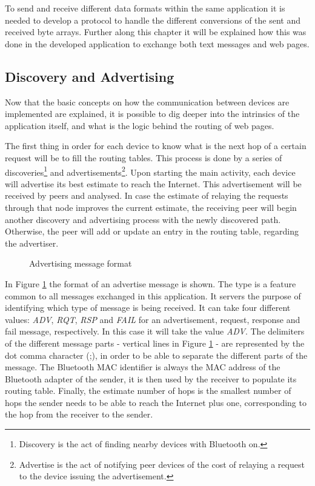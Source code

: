 To send and receive different data formats within the same application it is needed to develop a protocol to handle the different conversions of the sent and received byte arrays. Further along this chapter it will be explained how this was done in the developed application to exchange both text messages and web pages.

\subsection{Discovery and Advertising}
\label{subsec:disandadv}

Now that the basic concepts on how the communication between devices are implemented are explained, it is possible to dig deeper into the intrinsics of the application itself, and what is the logic behind the routing of web pages.

The first thing in order for each device to know what is the next hop of a certain request will be to fill the routing tables. This process is done by a series of discoveries\footnote{Discovery is the act of finding nearby devices with Bluetooth on.} and advertisements\footnote{Advertise is the act of notifying peer devices of the cost of relaying a request to the device issuing the advertisement.}. Upon starting the main activity, each device will advertise its best estimate to reach the Internet. This advertisement will be received by peers and analysed. In case the estimate of relaying the requests through that node improves the current estimate, the receiving peer will begin another discovery and advertising process with the newly discovered path. Otherwise, the peer will add or update an entry in the routing table, regarding the advertiser.

\begin{figure}[ht]
   \noindent{}
	\caption{\label{fig:advmsg} Advertising message format}
\end{figure}

In Figure \ref{fig:advmsg} the format of an advertise message is shown. The type is a feature common to all messages exchanged in this application. It servers the purpose of identifying which type of message is being received. It can take four different values: \textit{ADV}, \textit{RQT}, \textit{RSP} and \textit{FAIL} for an advertisement, request, response and fail message, respectively. In this case it will take the value \textit{ADV}. The delimiters of the different message parts - vertical lines in Figure \ref{fig:advmsg} - are represented by the dot comma character (;), in order to be able to separate the different parts of the message. The Bluetooth \gls{MAC} identifier is always the \gls{MAC} address of the Bluetooth adapter of the sender, it is then used by the receiver to populate its routing table. Finally, the estimate number of hops is the smallest number of hops the sender needs to be able to reach the Internet plus one, corresponding to the hop from the receiver to the sender.

